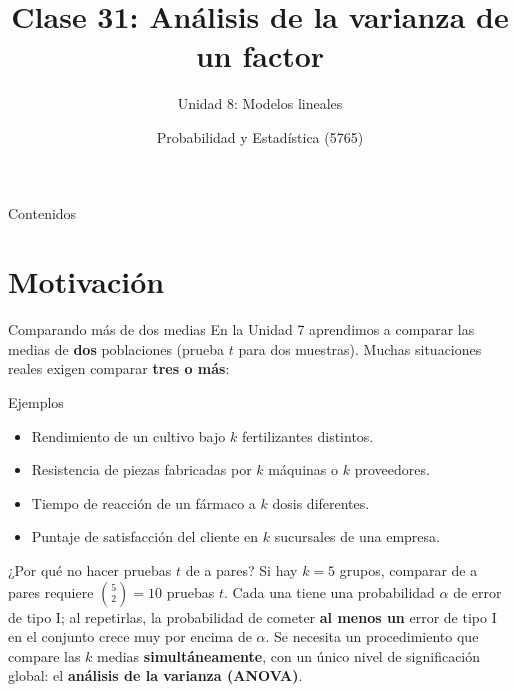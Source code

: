 \documentclass[aspectratio=169,11pt]{beamer}
\title[Prob. y Estadística]{Clase 31: Análisis de la varianza de un factor}
\subtitle{Unidad 8: Modelos lineales}
\institute[UNS]{Universidad Nacional del Sur \\ Departamento de Matemática}
\author{Probabilidad y Estadística (5765)}
\date{}
\begin{document}
\begin{frame}
\titlepage
\end{frame}

\begin{frame}{Contenidos}
\tableofcontents
\end{frame}

\section{Motivación}

\begin{frame}{Comparando más de dos medias}
En la Unidad 7 aprendimos a comparar las medias de \textbf{dos} poblaciones (prueba $t$ para dos muestras). Muchas situaciones reales exigen comparar \textbf{tres o más}:

\begin{exampleblock}{Ejemplos}
\begin{itemize}
\item Rendimiento de un cultivo bajo $k$ fertilizantes distintos.
\item Resistencia de piezas fabricadas por $k$ máquinas o $k$ proveedores.
\item Tiempo de reacción de un fármaco a $k$ dosis diferentes.
\item Puntaje de satisfacción del cliente en $k$ sucursales de una empresa.
\end{itemize}
\end{exampleblock}

\begin{alertblock}{¿Por qué no hacer pruebas $t$ de a pares?}
Si hay $k=5$ grupos, comparar de a pares requiere $\binom{5}{2}=10$ pruebas $t$. Cada una tiene una probabilidad $\alpha$ de error de tipo I; al repetirlas, la probabilidad de cometer \textbf{al menos un} error de tipo I en el conjunto crece muy por encima de $\alpha$. Se necesita un procedimiento que compare las $k$ medias \textbf{simultáneamente}, con un único nivel de significación global: el \textbf{análisis de la varianza (ANOVA)}.
\end{alertblock}
\end{frame}
\end{document}
